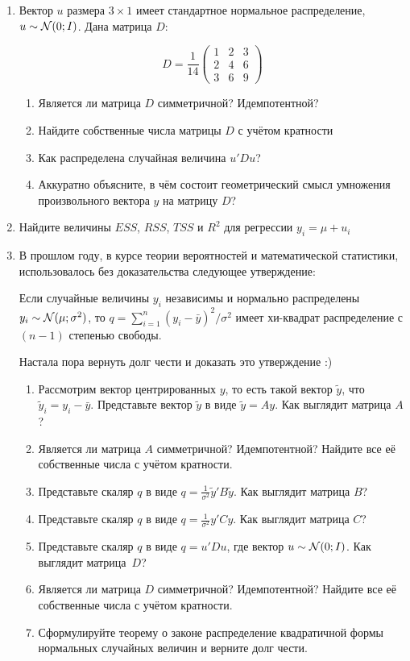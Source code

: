 \documentclass[12pt, a4paper]{article}
\begin{document}
\begin{enumerate}
\item Вектор $u$ размера $3 \times 1$ имеет стандартное нормальное распределение, $u \sim \mathcal{N} (0; I)$. Дана матрица $D$:

\[
D = \frac{1}{14} \begin{pmatrix}
1 & 2 & 3 \\
2 & 4 & 6 \\
3 & 6 & 9
\end{pmatrix}
\]

\begin{enumerate}
  \item Является ли матрица $D$ симметричной? Идемпотентной?
  \item Найдите собственные числа матрицы $D$ с учётом кратности
  \item Как распределена случайная величина $u'Du$?
  \item Аккуратно объясните, в чём состоит геометрический смысл умножения произвольного вектора $y$ на матрицу $D$?
\end{enumerate}

\item Найдите величины $ESS$, $RSS$, $TSS$ и $R^2$ для регрессии $y_i = \mu + u_i$

\item В прошлом году, в курсе теории вероятностей и математической статистики, использовалось без доказательства следующее утверждение:

Если случайные величины $y_i$ независимы и нормально распределены $y_i \sim \mathcal{N} (\mu; \sigma^2)$, то $q = \sum_{i=1}^n (y_i - \bar y)^2 / \sigma^2$ имеет хи-квадрат распределение с $(n - 1)$ степенью свободы.

Настала пора вернуть долг чести и доказать это утверждение :)

\begin{enumerate}
  \item Рассмотрим вектор центрированных $y$, то есть такой вектор $\tilde y$, что $\tilde y_i = y_i - \bar y$. Представьте вектор $\tilde y$ в виде $\tilde y = A y$. Как выглядит матрица $A$?
  \item Является ли матрица $A$ симметричной? Идемпотентной? Найдите все её собственные числа с учётом кратности.
  \item Представьте скаляр $q$ в виде $q= \frac{1}{\sigma^2} \tilde y' B \tilde y$. Как выглядит матрица $B$?
  \item Представьте скаляр $q$ в виде $q= \frac{1}{\sigma^2} y' C y$. Как выглядит матрица $C$?
  \item Представьте скаляр $q$ в виде $q= u' D u$, где вектор $u \sim \mathcal{N}(0; I)$. Как выглядит матрица~$D$?
  \item Является ли матрица $D$ симметричной? Идемпотентной? Найдите все её собственные числа с учётом кратности.
  \item Сформулируйте теорему о законе распределение квадратичной формы нормальных случайных величин и верните долг чести.
\end{enumerate}


\end{enumerate}
\end{document}
